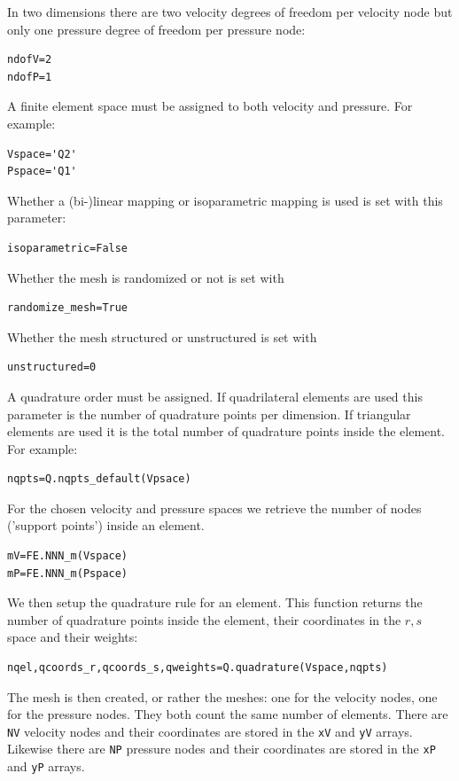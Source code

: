 In two dimensions there are two velocity degrees of freedom per 
velocity node but only one pressure degree of freedom per pressure node:
\begin{lstlisting}
ndofV=2
ndofP=1
\end{lstlisting}

A finite element space must be assigned to both velocity and pressure. For example: 
\begin{lstlisting}
Vspace='Q2'
Pspace='Q1'
\end{lstlisting}

Whether a (bi-)linear mapping or isoparametric mapping is used is set with 
this parameter:
\begin{lstlisting}
isoparametric=False
\end{lstlisting}

Whether the mesh is randomized or not is set with 
\begin{lstlisting}
randomize_mesh=True
\end{lstlisting}

Whether the mesh structured or unstructured is set with 
\begin{lstlisting}
unstructured=0
\end{lstlisting}

A quadrature order must be assigned. If quadrilateral elements are used
this parameter is the number of quadrature points per dimension. 
If triangular elements are used it is the total number of quadrature points 
inside the element. For example: 
\begin{lstlisting}
nqpts=Q.nqpts_default(Vpsace)
\end{lstlisting}

For the chosen velocity and pressure spaces we retrieve the number of nodes 
('support points') inside an element.
\begin{lstlisting}
mV=FE.NNN_m(Vspace)
mP=FE.NNN_m(Pspace)
\end{lstlisting}

We then setup the quadrature rule for an element. This function 
returns the number of quadrature points inside the element, 
their coordinates in the $r,s$ space and their weights: 
\begin{lstlisting}
nqel,qcoords_r,qcoords_s,qweights=Q.quadrature(Vspace,nqpts)
\end{lstlisting}

The mesh is then created, or rather the meshes: one for the 
velocity nodes, one for the pressure nodes. They both count the 
same number of elements. There are \lstinline{NV} velocity nodes and their
coordinates are stored in the \lstinline{xV} and \lstinline{yV} arrays.
Likewise there are \lstinline{NP} pressure nodes and their
coordinates are stored in the \lstinline{xP} and \lstinline{yP} arrays. 

